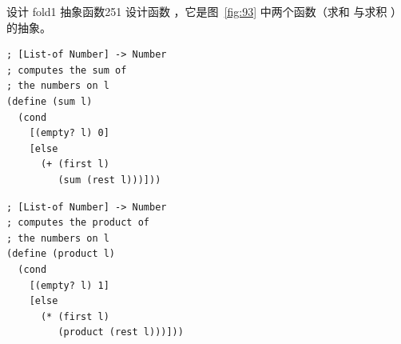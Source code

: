 \begin{exercise}{设计 fold1 抽象函数}{251}
设计函数 ，它是图~\ref{fig:93} 中两个函数（求和  与求积 ）的抽象。

\begin{center}
  \begin{stepperbox}[unbreakable]
    \noindent\begin{minipage}[t]{0.48\linewidth}\vspace{0pt}
\begin{Verbatim}[commandchars=\\\{\}, fontsize=\fontsize{6.0pt}{7.2pt}\selectfont]
; [List-of Number] -> Number
; computes the sum of
; the numbers on l
(define (sum l)
  (cond
    [(empty? l) 0]
    [else
      (+ (first l)
         (sum (rest l)))]))
\end{Verbatim}
    \end{minipage}\hfill
    \begin{minipage}[t]{0.48\linewidth}\vspace{0pt}
\begin{Verbatim}[commandchars=\\\{\}, fontsize=\fontsize{6.0pt}{7.2pt}\selectfont]
; [List-of Number] -> Number
; computes the product of
; the numbers on l
(define (product l)
  (cond
    [(empty? l) 1]
    [else
      (* (first l)
         (product (rest l)))]))
\end{Verbatim}
    \end{minipage}
  \end{stepperbox}
  \label{fig:93}
\end{center}
\end{exercise}

